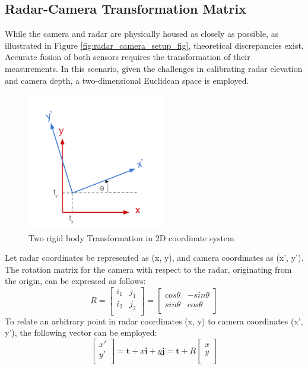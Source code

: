 \subsection{Radar-Camera Transformation Matrix}
While the camera and radar are physically housed as closely as possible, 
as illustrated in Figure \ref{fig:radar_camera_setup_fig}, 
theoretical discrepancies exist.
Accurate fusion of both sensors requires the transformation of their measurements. 
In this scenario, given the challenges in calibrating radar elevation and camera depth, 
a two-dimensional Euclidean space is employed.

\begin{figure}[hpbt]
    \centering
    \includegraphics[width=6cm]{Figures/transformation.png}%
    \caption{Two rigid body Transformation in 2D coordinate system}
    \label{fig:transformation_figure}
\end{figure}
Let radar coordinates be represented as (x, y), 
and camera coordinates as (x', y'). 
The rotation matrix for the camera with respect to the radar, 
originating from the origin, can be expressed as follows:
\begin{equation}\label{equ:2d_rotation_eq}
    R=
    \begin{bmatrix}
        i_1 & j_1\\
        i_2 & j_2\\
        \end{bmatrix}=
    \begin{bmatrix}
    cos\theta & -sin\theta\\
    sin\theta & cos\theta\\
    \end{bmatrix}
\end{equation}
To relate an arbitrary point in radar coordinates (x, y) to camera coordinates (x', y'), 
the following vector can be employed:
\begin{equation}\label{equ:2d_vector_eq}
    \begin{bmatrix}
        x'\\ 
        y'\\
    \end{bmatrix}=
    \mathbf{t}+x\mathbf{i}+y\mathbf{j}=\mathbf{t}+R
    \begin{bmatrix}
    x\\
    y\\
    \end{bmatrix}
\end{equation}
